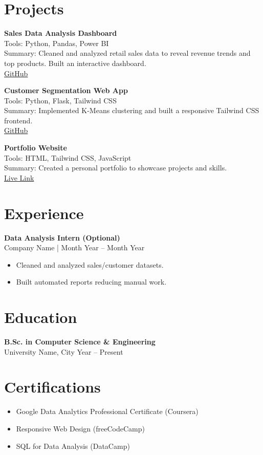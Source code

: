 \documentclass[a4paper,10pt]{article}
\newcommand{\cvsection}[2]{%
  \section*{\textcolor{blue!50!black}{#1}}\label{#2}%
  \vspace{4pt}%
}
\begin{document}
\cvsection{Projects}{sec:projects}
\textbf{Sales Data Analysis Dashboard} \\
Tools: Python, Pandas, Power BI \\
Summary: Cleaned and analyzed retail sales data to reveal revenue trends and top products. Built an interactive dashboard. \\
\href{https://github.com/yourgithub/sales-dashboard}{GitHub}

\vspace{4pt}
\textbf{Customer Segmentation Web App} \\
Tools: Python, Flask, Tailwind CSS \\
Summary: Implemented K-Means clustering and built a responsive Tailwind CSS frontend. \\
\href{https://github.com/yourgithub/customer-segmentation-app}{GitHub}

\vspace{4pt}
\textbf{Portfolio Website} \\
Tools: HTML, Tailwind CSS, JavaScript \\
Summary: Created a personal portfolio to showcase projects and skills. \\
\href{https://yourwebsite.com}{Live Link}

\cvsection{Experience}{sec:experience}
\textbf{Data Analysis Intern (Optional)} \\
Company Name \; | \; Month Year -- Month Year \\
\begin{itemize}
  \item Cleaned and analyzed sales/customer datasets.
  \item Built automated reports reducing manual work.
\end{itemize}

\cvsection{Education}{sec:education}
\textbf{B.Sc. in Computer Science \& Engineering} \\
University Name, City \hfill Year -- Present

\cvsection{Certifications}{sec:certs}
\begin{itemize}
  \item Google Data Analytics Professional Certificate (Coursera)
  \item Responsive Web Design (freeCodeCamp)
  \item SQL for Data Analysis (DataCamp)
\end{itemize}
\end{document}
